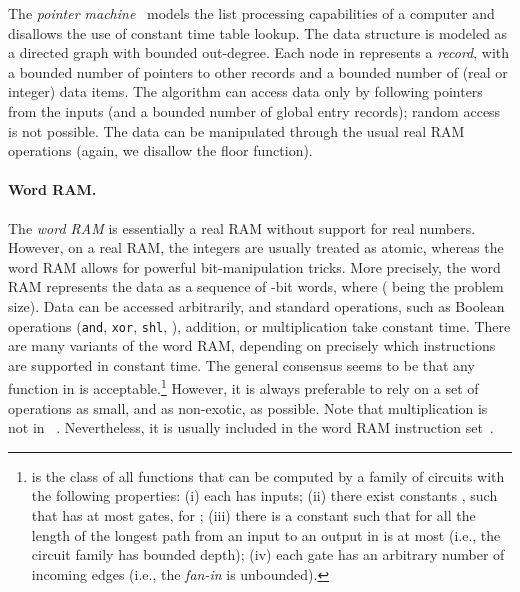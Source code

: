 \documentclass[11pt]{paper}
\begin{document}
The  \emph{pointer machine}~\cite{Knuth97} models 
the list processing capabilities
of a computer and
disallows the use of constant time table lookup.
The data structure is modeled as a directed
graph  with bounded out-degree. Each node in
 represents a \emph{record}, with a bounded
number of pointers to other records and a bounded number
of (real or integer) data items.  
The algorithm can access data only by following pointers
from the inputs  (and a bounded number of global entry
records); random access is not possible. The data can be 
manipulated through the usual real RAM operations (again, 
we disallow the floor function). 


\paragraph{Word RAM.}
The \emph{word RAM} is essentially a real RAM without
support for real numbers. However, on a real RAM,
the integers are usually treated as atomic, whereas
the word RAM allows for powerful bit-manipulation tricks.
More precisely, the word RAM represents the 
data as a sequence of
-bit words, where  ( being the
problem size).
Data can be accessed arbitrarily, and standard
operations, such as Boolean operations 
(\texttt{and}, \texttt{xor}, \texttt{shl}, ), addition, or
multiplication take constant time. There are many variants of
the word RAM, depending on precisely which instructions are 
supported in constant time. The general consensus seems
to be that any function in 
is acceptable.\footnote{ is the 
class of all functions  that
can be computed by a family of circuits  with the 
following properties: (i) each  has  inputs; (ii) there exist constants
, such that  has at most  gates, for ; 
(iii) there is a constant  such that for all  the length of the longest
path from an input to an output in  is at most  (i.e., the
circuit family has bounded depth); (iv) each gate
has an arbitrary number of incoming edges (i.e., the \emph{fan-in} is 
unbounded).} However, it is always preferable to rely on a set of operations
as small, and as non-exotic, as possible.
Note that multiplication is not in ~\cite{FurstSaSi84}. 
Nevertheless, it is usually
included in the word RAM instruction set~\cite{FredmanWi94}.
\end{document}
